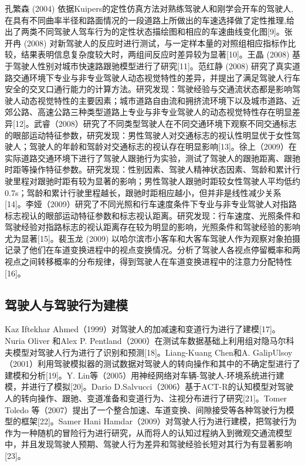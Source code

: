孔繁森 (2004) 依据Kuipers的定性仿真方法对熟练驾驶人和刚学会开车的驾驶人,在具有不同曲率半径和路面情况的一段道路上所做出的车速选择做了定性推理,给出了两类不同驾驶人驾车行为的定性状态描绘图和相应的车速曲线变化图[9]。张开冉 (2008) 对新驾驶人的反应时进行测试，与一定样本量的对照组相应指标作比较，结果表明信息复杂度较大时，两组间反应时差异较为显著[10]。王晶 (2008) 基于驾驶人性别对城市快速路跟驰模型进行了研究[11]。范红静 (2008) 研究了真实道路交通环境下专业与非专业驾驶人动态视觉特性的差异，并提出了满足驾驶人行车安全的交叉口通行能力的计算方法。研究发现：驾驶经验与交通流状态都是影响驾驶人动态视觉特性的主要因素；城市道路自由流和拥挤流环境下以及城市道路、近郊公路、高速公路三种类型道路上专业与非专业驾驶人的动态视觉特性存在明显差异[12]。武睿（2008）研究了不同类型驾驶人在不同交通环境下观察不同交通标志的眼部运动特征参数，研究发现：男性驾驶人对交通标志的视认性明显优于女性驾驶人；驾驶人的年龄和驾龄对交通标志的视认存在明显影响[13]。徐上（2009）在实际道路交通环境下进行了驾驶人跟驰行为实验，测试了驾驶人的跟驰距离、跟驰时距等操作特征参数。研究发现：性别因素、驾驶人精神状态因素、驾龄和累计行驶里程对跟驰时距有较为显著的影响；男性驾驶人跟驰时距较女性驾驶人平均低约 0.7s；驾龄和累计行驶里程越长，跟驰时距相应越小，但并非是线性减少关系[14]。李娅（2009）研究了不同光照和行车速度条件下专业与非专业驾驶人对指路标志视认的眼部运动特征参数和标志视认距离。研究发现：行车速度、光照条件和驾驶经验对指路标志的视认距离存在较为明显的影响，光照条件和驾驶经验的影响尤为显著[15]。裴玉龙 (2009) 以哈尔滨市小客车和大客车驾驶人作为观察对象拍摄记录了他们在车道变换进程中的视点变换情况。分析了驾驶人各视点停留概率和两视点之间转移概率的分布规律，得到驾驶人在车道变换进程中的注意力分配特性[16]。

\subsection{驾驶人与驾驶行为建模}

Kaz Iftekhar Ahmed（1999）对驾驶人的加减速和变道行为进行了建模[17]。Nuria Oliver 和Alex P. Pentland（2000）在测试车数据基础上利用组对隐马尔科夫模型对驾驶人行为进行了识别和预测[18]。Liang-Kuang Chen和A. GalipUlsoy（2001）利用驾驶模拟器的测试数据对驾驶人的转向操作和其中的不确定型进行了建模和分析[19]。Y. Lin等（2005）用神经网络对车辆-驾驶人-环境系统进行建模，并进行了模拟[20]。Dario D.Salvucci（2006）基于ACT-R的认知模型对驾驶人的转向操作、跟驰、变道准备和变道行为、注视分布进行了研究[21]。Tomer Toledo 等（2007）提出了一个整合加速、车道变换、间隙接受等各种驾驶行为模型的框架[22]。Samer Hani Hamdar（2009）对驾驶人行为进行建模，把驾驶行为作为一种随机的冒险行为进行研究，从而将人的认知过程纳入到微观交通流模型中，并且发现驾驶人预期、驾驶人行为差异和驾驶经验长短对其行为有显著影响[23]。

